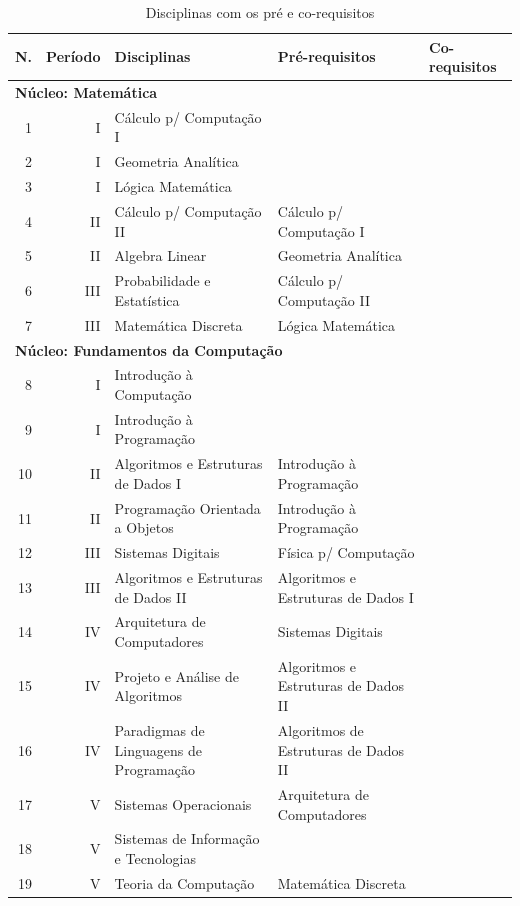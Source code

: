 \documentclass[
	12pt,				%
	openright,			%
  oneside,     %
	a4paper,			%
	chapter=TITLE,		%
	english,			%
	french,				%
	spanish,			%
	brazil				%
	]{abntex2}
\begin{document}
\begin{apendicesenv}
\begin{landscape}
    \begin{longtable}{r|r|l|l|l}
     \caption{Disciplinas com os pré e co-requisitos}
     \label{ltab:PreReq}
     \\
     \hline
    \textbf{N.} & \textbf{Período} & \textbf{Disciplinas} & \textbf{Pré-requisitos} & \textbf{Co-requisitos} \\
\hline
\multicolumn{5}{l}{\textbf{Núcleo: Matemática}}\\ \hline
    1     & I     & Cálculo p/ Computação I &       &       \\ \hline
    2     & I     & Geometria Analítica &       &        \\ \hline
    3     & I     & Lógica Matemática &       &        \\ \hline
    4     & II    & Cálculo p/ Computação II & Cálculo p/ Computação I &       \\ \hline
    5     & II    & Algebra Linear & Geometria Analítica &        \\ \hline
    6     & III   & Probabilidade e Estatística & Cálculo p/ Computação II &       \\ \hline
    7     & III   & Matemática Discreta & Lógica Matemática &        \\ \hline

\multicolumn{5}{l}{\textbf{Núcleo: Fundamentos da Computação}}\\ \hline
    8     & I     & Introdução à Computação &       &        \\ \hline
    9     & I     & Introdução à Programação &       &      \\ \hline
    10    & II    & Algoritmos e Estruturas de Dados I & Introdução à Programação &       \\ \hline
    11    & II    & Programação Orientada a Objetos & Introdução à Programação &       \\ \hline
    12    & III   & Sistemas Digitais & Física p/ Computação &       \\ \hline
    13    & III   & Algoritmos e Estruturas de Dados II & Algoritmos e Estruturas de Dados I &       \\ \hline
    14    & IV    & Arquitetura de Computadores & Sistemas Digitais &       \\ \hline
    15    & IV    & Projeto e Análise de Algoritmos & Algoritmos e Estruturas de Dados II &       \\ \hline
    16    & IV    & Paradigmas de Linguagens de Programação & Algoritmos de Estruturas de Dados II &       \\ \hline
    17    & V     & Sistemas Operacionais & Arquitetura de Computadores &       \\ \hline
    18    & V     & Sistemas de Informação e Tecnologias &       &       \\ \hline
    19    & V     & Teoria da Computação & Matemática Discreta &        \\ \hline


\end{longtable}
\end{landscape}
\end{apendicesenv}
\end{document}
